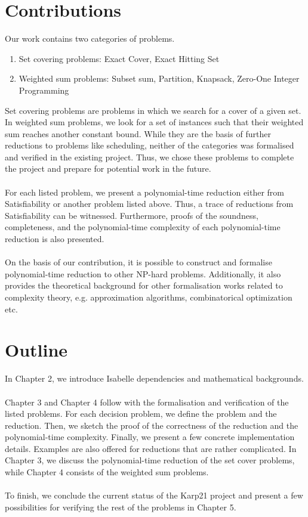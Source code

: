 \section{Contributions}
Our work contains two categories of problems. 
\begin{enumerate}
    \item Set covering problems: Exact Cover, Exact Hitting Set
    \item Weighted sum problems: Subset sum, Partition, Knapsack, Zero-One Integer Programming
\end{enumerate}
Set covering problems are problems in which we search for a cover of a given set. In weighted sum problems, 
we look for a set of instances such that their weighted sum reaches another constant bound. While they are the basis of further reductions to problems like 
scheduling, neither of the categories was formalised and verified in the existing project. 
Thus, we chose these problems to complete the project and prepare for potential work in the future.\\\\ 
For each listed problem, we present a polynomial-time reduction either from Satisfiability or another problem listed above. 
Thus, a trace of reductions from Satisfiability can be witnessed. 
Furthermore, proofs of the soundness, completeness, 
and the polynomial-time complexity of each polynomial-time reduction is also presented. \\\\
On the basis of our contribution, it is possible to construct and formalise polynomial-time reduction to other NP-hard problems. 
Additionally, it also provides the theoretical background for other formalisation works related to complexity theory, e.g. 
approximation algorithms, combinatorical optimization etc. 

\section{Outline}
In Chapter 2, we introduce Isabelle dependencies and mathematical backgrounds.\\\\
Chapter 3 and Chapter 4 follow with the formalisation and verification of the listed problems. For each decision problem, 
we define the problem and the reduction. Then, we sketch the proof of the correctness of the reduction and the polynomial-time complexity.
Finally, we present a few concrete implementation details. Examples are also offered for reductions that are rather complicated. 
In Chapter 3, we discuss the polynomial-time reduction of the set cover problems, while Chapter 4 consists of the weighted sum problems. \\\\
To finish, we conclude the current status of the Karp21 project
and present a few possibilities for verifying the rest of the problems in Chapter 5.
